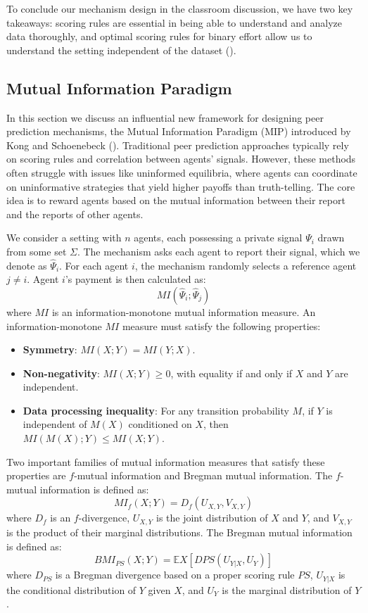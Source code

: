 \documentclass[
  letterpaper,
  numbers=noenddot,
  DIV=11,
  oneside]{scrreprt}
\theoremstyle{remark}
\begin{document}
To conclude our mechanism design in the classroom discussion, we have
two key takeaways: scoring rules are essential in being able to
understand and analyze data thoroughly, and optimal scoring rules for
binary effort allow us to understand the setting independent of the
dataset ().

\subsection*{Mutual Information
Paradigm}\label{mutual-information-paradigm}

In this section we discuss an influential new framework for designing
peer prediction mechanisms, the Mutual Information Paradigm (MIP)
introduced by Kong and Schoenebeck
().
Traditional peer prediction approaches typically rely on scoring rules
and correlation between agents' signals. However, these methods often
struggle with issues like uninformed equilibria, where agents can
coordinate on uninformative strategies that yield higher payoffs than
truth-telling. The core idea is to reward agents based on the mutual
information between their report and the reports of other agents.

We consider a setting with \(n\) agents, each possessing a private
signal \(\Psi_i\) drawn from some set \(\Sigma\). The mechanism asks
each agent to report their signal, which we denote as \(\hat{\Psi}_i\).
For each agent \(i\), the mechanism randomly selects a reference agent
\(j \neq i\). Agent \(i\)'s payment is then calculated as:
\[MI(\hat{\Psi}_i; \hat{\Psi}_j)\] where \(MI\) is an
information-monotone mutual information measure. An information-monotone
\(MI\) measure must satisfy the following properties:

\begin{itemize}
\item
  \textbf{Symmetry}: \(MI(X; Y) = MI(Y; X)\).
\item
  \textbf{Non-negativity}: \(MI(X; Y) \geq 0\), with equality if and
  only if \(X\) and \(Y\) are independent.
\item
  \textbf{Data processing inequality}: For any transition probability
  \(M\), if \(Y\) is independent of \(M(X)\) conditioned on \(X\), then
  \(MI(M(X); Y) \leq MI(X; Y)\).
\end{itemize}

Two important families of mutual information measures that satisfy these
properties are \(f\)-mutual information and Bregman mutual information.
The \(f\)-mutual information is defined as:
\[MI_f(X; Y) = D_f(U_{X,Y}, V_{X,Y})\] where \(D_f\) is an
\(f\)-divergence, \(U_{X,Y}\) is the joint distribution of \(X\) and
\(Y\), and \(V_{X,Y}\) is the product of their marginal distributions.
The Bregman mutual information is defined as:
\[BMI_{PS}(X; Y) = \mathbb{E}X [D{PS}(U_{Y|X}, U_Y)]\] where \(D_{PS}\)
is a Bregman divergence based on a proper scoring rule \(PS\),
\(U_{Y|X}\) is the conditional distribution of \(Y\) given \(X\), and
\(U_Y\) is the marginal distribution of \(Y\).
\end{document}
